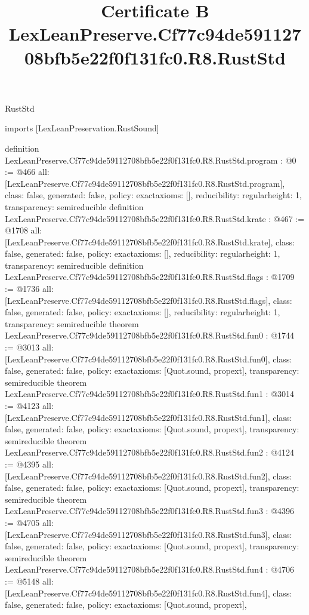 \begin{lexlean}{RustStd}
\title{Certificate B LexLeanPreserve.Cf77c94de59112708bfb5e22f0f131fc0.R8.RustStd}
\begin{coremodule}
imports [LexLeanPreservation.RustSound]

definition LexLeanPreserve.Cf77c94de59112708bfb5e22f0f131fc0.R8.RustStd.program : @0 := @466 {
  all: [LexLeanPreserve.Cf77c94de59112708bfb5e22f0f131fc0.R8.RustStd.program],
  class: false,
  generated: false,
  policy: exact{axioms: []},
  reducibility: regular{height: 1},
  transparency: semireducible
}
definition LexLeanPreserve.Cf77c94de59112708bfb5e22f0f131fc0.R8.RustStd.krate : @467 := @1708 {
  all: [LexLeanPreserve.Cf77c94de59112708bfb5e22f0f131fc0.R8.RustStd.krate],
  class: false,
  generated: false,
  policy: exact{axioms: []},
  reducibility: regular{height: 1},
  transparency: semireducible
}
definition LexLeanPreserve.Cf77c94de59112708bfb5e22f0f131fc0.R8.RustStd.flags : @1709 := @1736 {
  all: [LexLeanPreserve.Cf77c94de59112708bfb5e22f0f131fc0.R8.RustStd.flags],
  class: false,
  generated: false,
  policy: exact{axioms: []},
  reducibility: regular{height: 1},
  transparency: semireducible
}
theorem LexLeanPreserve.Cf77c94de59112708bfb5e22f0f131fc0.R8.RustStd.fun0 : @1744 := @3013 {
  all: [LexLeanPreserve.Cf77c94de59112708bfb5e22f0f131fc0.R8.RustStd.fun0],
  class: false,
  generated: false,
  policy: exact{axioms: [Quot.sound, propext]},
  transparency: semireducible
}
theorem LexLeanPreserve.Cf77c94de59112708bfb5e22f0f131fc0.R8.RustStd.fun1 : @3014 := @4123 {
  all: [LexLeanPreserve.Cf77c94de59112708bfb5e22f0f131fc0.R8.RustStd.fun1],
  class: false,
  generated: false,
  policy: exact{axioms: [Quot.sound, propext]},
  transparency: semireducible
}
theorem LexLeanPreserve.Cf77c94de59112708bfb5e22f0f131fc0.R8.RustStd.fun2 : @4124 := @4395 {
  all: [LexLeanPreserve.Cf77c94de59112708bfb5e22f0f131fc0.R8.RustStd.fun2],
  class: false,
  generated: false,
  policy: exact{axioms: [Quot.sound, propext]},
  transparency: semireducible
}
theorem LexLeanPreserve.Cf77c94de59112708bfb5e22f0f131fc0.R8.RustStd.fun3 : @4396 := @4705 {
  all: [LexLeanPreserve.Cf77c94de59112708bfb5e22f0f131fc0.R8.RustStd.fun3],
  class: false,
  generated: false,
  policy: exact{axioms: [Quot.sound, propext]},
  transparency: semireducible
}
theorem LexLeanPreserve.Cf77c94de59112708bfb5e22f0f131fc0.R8.RustStd.fun4 : @4706 := @5148 {
  all: [LexLeanPreserve.Cf77c94de59112708bfb5e22f0f131fc0.R8.RustStd.fun4],
  class: false,
  generated: false,
  policy: exact{axioms: [Quot.sound, propext]},
}
\end{coremodule}
\end{lexlean}
